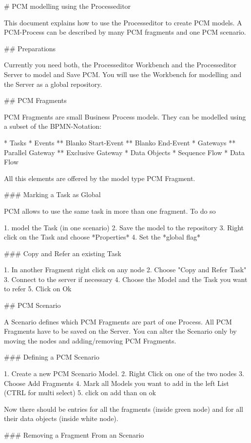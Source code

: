 \documentclass{acm_proc_article-sp}
\begin{document}
\begin{markdown}
# PCM modelling using the Processeditor

This document explains how to use the Processeditor to create PCM models.
A PCM-Process can be described by many PCM fragments and one PCM scenario.

## Preparations

Currently you need both, the Processeditor Workbench and the Processeditor Server to model and Save PCM.
You will use the Workbench for modelling and the Server as a global repository.

## PCM Fragments

PCM Fragments are small Business Process models. They can be modelled using a subset of the BPMN-Notation:

* Tasks
* Events
** Blanko Start-Event
** Blanko End-Event
* Gateways
** Parallel Gateway
** Exclusive Gateway
* Data Objects
* Sequence Flow
* Data Flow

All this elements are offered by the model type PCM Fragment.

### Marking a Task as Global

PCM allows to use the same task in more than one fragment. To do so

1. model the Task (in one scenario)
2. Save the model to the repository
3. Right click on the Task and choose *Properties*
4. Set the *global flag*

### Copy and Refer an existing Task

1. In another Fragment right click on any node
2. Choose "Copy and Refer Task"
3. Connect to the server if necessary
4. Choose the Model and the Task you want to refer
5. Click on Ok

## PCM Scenario

A Scenario defines which PCM Fragments are part of one Process.
All PCM Fragments have to be saved on the Server. You can alter the Scenario only by moving the nodes and adding/removing PCM Fragments.

### Defining a PCM Scenario

1. Create a new PCM Scenario Model.
2. Right Click on one of the two nodes
3. Choose Add Fragments
4. Mark all Models you want to add in the left List (CTRL for multi select)
5. click on add than on ok

Now there should be entries for all the fragments (inside green node) and for all their data objects (inside white node).

### Removing a Fragment From an Scenario


\end{markdown}
\end{document}

